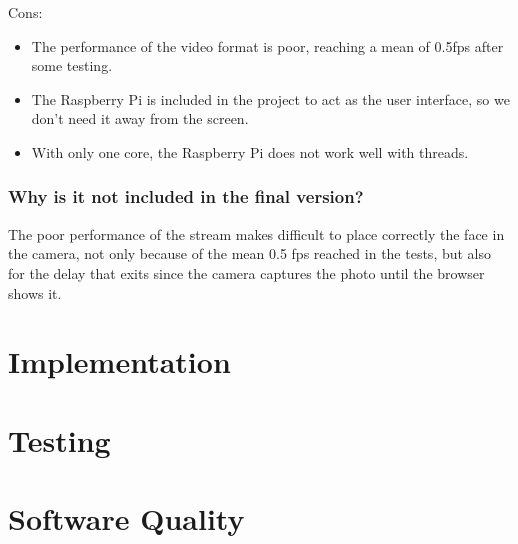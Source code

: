 		Cons:
		\begin{itemize}
			\item The performance of the video format is poor, reaching a mean of 0.5fps after some testing.
			\item The Raspberry Pi is included in the project to act as the user interface, so we don't need it away from the screen.
			\item With only one core, the Raspberry Pi does not work well with threads.
		\end{itemize}
		
		\subsubsection{Why is it not included in the final version?}
		The poor performance of the stream makes difficult to place correctly the face in the camera, not only because of the mean 0.5 fps reached in the tests, but also for the delay that exits since the camera captures the photo until the browser shows it. 

\section{Implementation}
\section{Testing}
\section{Software Quality}
